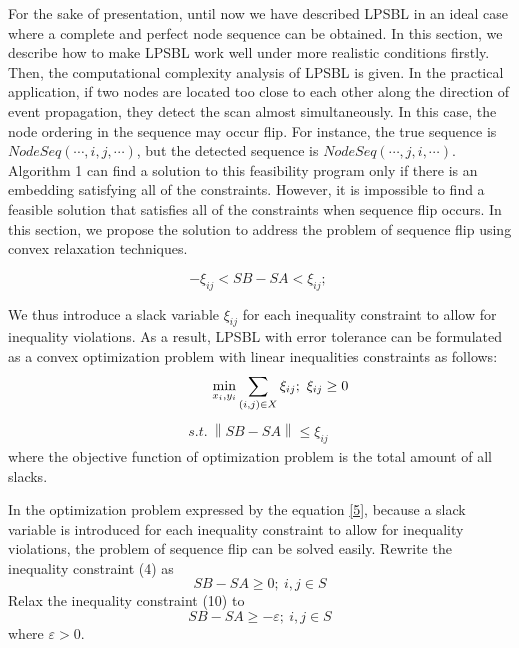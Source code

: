 For the sake of presentation, until now we have described LPSBL in an ideal case where a complete and perfect node sequence can be obtained. 
In this section, we describe how to make LPSBL work well under more realistic conditions firstly. 
Then, the computational complexity analysis of LPSBL is given.
In the practical application, if two nodes are located too close to each other along the direction of event propagation, they detect the scan almost simultaneously. 
In this case, the node ordering in the sequence may occur flip. 
For instance, the true sequence is $NodeSeq( \cdots ,i,j, \cdots )$, but the detected sequence is $NodeSeq( \cdots ,j,i, \cdots )$.
Algorithm 1 can find a solution to this feasibility program only if there is an embedding satisfying all of the constraints. 
However, it is impossible to find a feasible solution that satisfies all of the constraints when sequence flip occurs. 
In this section, we propose the solution to address the problem of sequence flip using convex relaxation techniques.


\begin{equation} \label{3-1}
-{\xi _{ij}}< SB-SA <{\xi _{ij}}; \
 \end{equation}


We thus introduce a slack variable ${\xi _{ij}}$ for each inequality constraint to allow for inequality violations.
 As a result, LPSBL with error tolerance can be formulated as a convex optimization problem with linear inequalities constraints as follows:
 \begin{equation} \label{5}
\quad \quad \quad \mathop {\min }\limits_{{x_i},{y_i}} \sum\limits_{(i,j) \in X} {{\xi _{ij}}};\  \xi _{ij} \ge 0\\
  \end{equation}
  \begin{align*}
 s.t.\  \left\| {SB - SA } \right\| \le \xi _{ij} \
\end{align*}
where the objective function of optimization problem is the total amount of all slacks.

In the optimization problem expressed by the equation \eqref{5}, because a slack variable is introduced for each inequality constraint to allow for inequality violations, the problem of sequence flip can be solved easily.
 Rewrite the inequality constraint (4) as
 \begin{equation} \label{10}
SB - SA  \ge  0 ; \  i,j \in S
 \end{equation}
 Relax the inequality constraint (10) to
  \begin{equation} \label{11}
SB - SA  \ge  -\varepsilon ; \  i,j \in S
 \end{equation}
 where
\begin{math}
\varepsilon  > 0
\end{math}.

